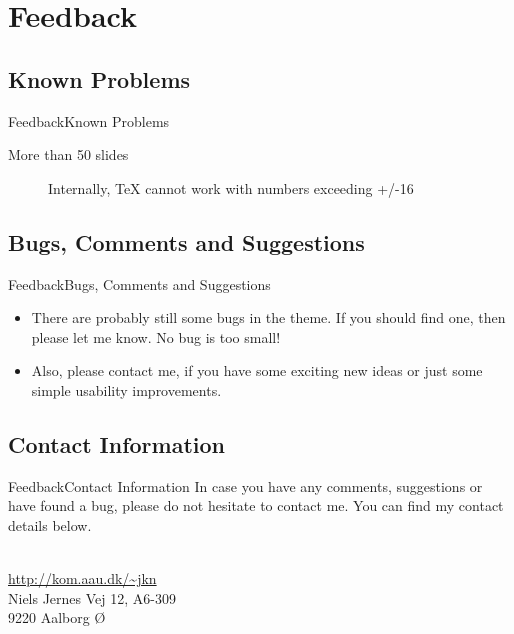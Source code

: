 \documentclass[10pt]{beamer}
\newcommand{\chref}[2]{%
  \href{#1}{{\usebeamercolor[bg]{AAUsimple}#2}}%
}
\begin{document}
\section{Feedback}
\subsection{Known Problems}
\begin{frame}{Feedback}{Known Problems}
  \begin{description}
    \item[More than 50 slides] Internally, TeX cannot work with numbers exceeding +/-16
  \end{description}
\end{frame}

\subsection{Bugs, Comments and Suggestions}
\begin{frame}{Feedback}{Bugs, Comments and Suggestions}
  \begin{itemize}
    \item<1-> There are probably still some bugs in the theme. If you should find one, then please let me know. No bug is too small!
    \item<2-> Also, please contact me, if you have some exciting new ideas or just some simple usability improvements.
  \end{itemize}
\end{frame}

\subsection{Contact Information}
\begin{frame}{Feedback}{Contact Information}
In case you have any comments, suggestions or have found a bug, please do not hesitate to contact me. You can find my contact details below.
  \begin{center}
    \insertauthor\\
    \chref{http://kom.aau.dk/~jkn}{http://kom.aau.dk/\textasciitilde jkn}\\
    Niels Jernes Vej 12, A6-309\\
    9220 Aalborg Ø
  \end{center}
\end{frame}

{\aauwavesbg
\begin{frame}
\end{frame}}
\end{document}
